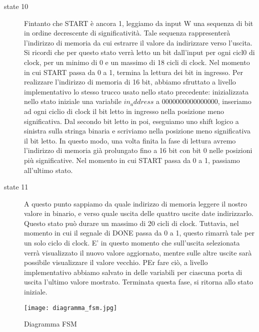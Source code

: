 \documentclass{article}
\begin{document}
\begin{description}
\item[state 10]
Fintanto che START è ancora 1, leggiamo da input W una sequenza di bit in ordine decrescente di significatività. Tale sequenza rappresenterà l'indirizzo di memoria da cui estrarre il valore da indirizzare verso l'uscita. Si ricordi che per questo stato verrà letto un bit dall'input per ogni cicl0 di clock, per un minimo di 0 e un massimo di 18 cicli di clock. Nel momento in cui START passa da 0 a 1, termina la lettura dei bit in ingresso. Per realizzare l'indirizzo di memoria di 16 bit, abbiamo sfruttato a livello implementativo lo stesso trucco usato nello stato precedente: inizializzata nello stato iniziale una variabile $in_address$ a 0000000000000000, inseriamo ad ogni ciclio di clock il bit letto in ingresso nella posizione meno significativa. Dal secondo bit letto in poi, eseguiamo uno shift logico a sinistra sulla stringa binaria e scriviamo nella posizione meno significativa il bit letto. In questo modo, una volta finita la fase di lettura avremo l'indirizzo di memoria già prolungato fino a 16 bit con bit 0 nelle posizioni più significative. Nel momento in cui START passa da 0 a 1, passiamo all'ultimo stato.

\item[state 11]
A questo punto sappiamo da quale indirizzo di memoria leggere il nostro valore in binario, e verso quale uscita delle quattro uscite date indirizzarlo. Questo stato può durare un massimo di 20 cicli di clock. Tuttavia, nel momento in cui il segnale di DONE passa da 0 a 1, questo rimarrà tale per un solo ciclo di clock. E' in questo momento che sull'uscita selezionata verrà visualizzato il nuovo valore aggiornato, mentre sulle altre uscite sarà possibile visualizzare il valore vecchio. PEr fare ciò, a livello implementativo abbiamo salvato in delle variabili per ciascuna porta di uscita l'ultimo valore mostrato. Terminata questa fase, si ritorna allo stato iniziale.
\end{description}

\begin{figure}[H]
\centerline{\texttt{[image: diagramma\_fsm.jpg]}}
\caption{Diagramma FSM}
\label{fig}
\end{figure}
\end{document}

